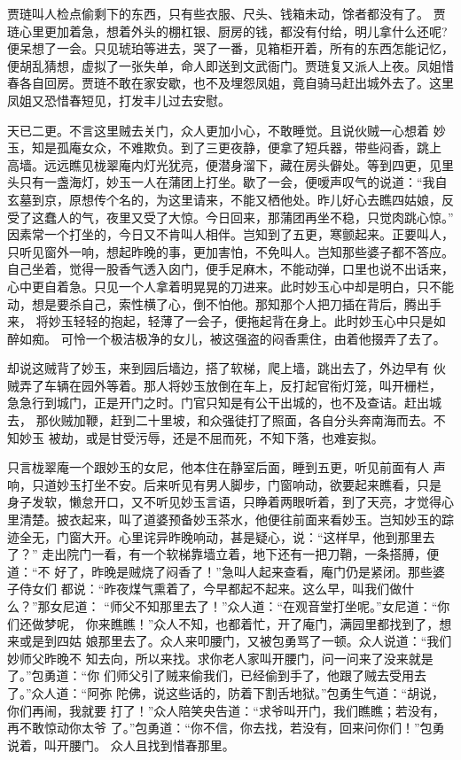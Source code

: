 贾琏叫人检点偷剩下的东西，只有些衣服、尺头、钱箱未动，馀者都没有了。
贾琏心里更加着急，想着外头的棚杠银、厨房的钱，都没有付给，明儿拿什么还呢?
便呆想了一会。只见琥珀等进去，哭了一番，见箱柜开着，所有的东西怎能记忆，
便胡乱猜想，虚拟了一张失单，命人即送到文武衙门。贾琏复又派人上夜。凤姐惜
春各自回房。贾琏不敢在家安歇，也不及埋怨凤姐，竟自骑马赶出城外去了。这里
凤姐又恐惜春短见，打发丰儿过去安慰。

天已二更。不言这里贼去关门，众人更加小心，不敢睡觉。且说伙贼一心想着
妙玉，知是孤庵女众，不难欺负。到了三更夜静，便拿了短兵器，带些闷香，跳上
高墙。远远瞧见栊翠庵内灯光犹亮，便潜身溜下，藏在房头僻处。等到四更，见里
头只有一盏海灯，妙玉一人在蒲团上打坐。歇了一会，便嗳声叹气的说道：“我自
玄墓到京，原想传个名的，为这里请来，不能又栖他处。昨儿好心去瞧四姑娘，反
受了这蠢人的气，夜里又受了大惊。今日回来，那蒲团再坐不稳，只觉肉跳心惊。”
因素常一个打坐的，今日又不肯叫人相伴。岂知到了五更，寒颤起来。正要叫人，
只听见窗外一响，想起昨晚的事，更加害怕，不免叫人。岂知那些婆子都不答应。
自己坐着，觉得一股香气透入囟门，便手足麻木，不能动弹，口里也说不出话来，
心中更自着急。只见一个人拿着明晃晃的刀进来。此时妙玉心中却是明白，只不能
动，想是要杀自己，索性横了心，倒不怕他。那知那个人把刀插在背后，腾出手来，
将妙玉轻轻的抱起，轻薄了一会子，便拖起背在身上。此时妙玉心中只是如醉如痴。
可怜一个极洁极净的女儿，被这强盗的闷香熏住，由着他掇弄了去了。

却说这贼背了妙玉，来到园后墙边，搭了软梯，爬上墙，跳出去了，外边早有
伙贼弄了车辆在园外等着。那人将妙玉放倒在车上，反打起官衔灯笼，叫开栅栏，
急急行到城门，正是开门之时。门官只知是有公干出城的，也不及查诘。赶出城去，
那伙贼加鞭，赶到二十里坡，和众强徒打了照面，各自分头奔南海而去。不知妙玉
被劫，或是甘受污辱，还是不屈而死，不知下落，也难妄拟。

只言栊翠庵一个跟妙玉的女尼，他本住在静室后面，睡到五更，听见前面有人
声响，只道妙玉打坐不安。后来听见有男人脚步，门窗响动，欲要起来瞧看，只是
身子发软，懒怠开口，又不听见妙玉言语，只睁着两眼听着，到了天亮，才觉得心
里清楚。披衣起来，叫了道婆预备妙玉茶水，他便往前面来看妙玉。岂知妙玉的踪
迹全无，门窗大开。心里诧异昨晚响动，甚是疑心，说：“这样早，他到那里去了？”
走出院门一看，有一个软梯靠墙立着，地下还有一把刀鞘，一条搭膊，便道：“不
好了，昨晚是贼烧了闷香了！”急叫人起来查看，庵门仍是紧闭。那些婆子侍女们
都说：“昨夜煤气熏着了，今早都起不起来。这么早，叫我们做什么？”那女尼道：
“师父不知那里去了！”众人道：“在观音堂打坐呢。”女尼道：“你们还做梦呢，
你来瞧瞧！”众人不知，也都着忙，开了庵门，满园里都找到了，想来或是到四姑
娘那里去了。众人来叩腰门，又被包勇骂了一顿。众人说道：“我们妙师父昨晚不
知去向，所以来找。求你老人家叫开腰门，问一问来了没来就是了。”包勇道：“你
们师父引了贼来偷我们，已经偷到手了，他跟了贼去受用去了。”众人道：“阿弥
陀佛，说这些话的，防着下割舌地狱。”包勇生气道：“胡说，你们再闹，我就要
打了！”众人陪笑央告道：“求爷叫开门，我们瞧瞧；若没有，再不敢惊动你太爷
了。”包勇道：“你不信，你去找，若没有，回来问你们！”包勇说着，叫开腰门。
众人且找到惜春那里。

